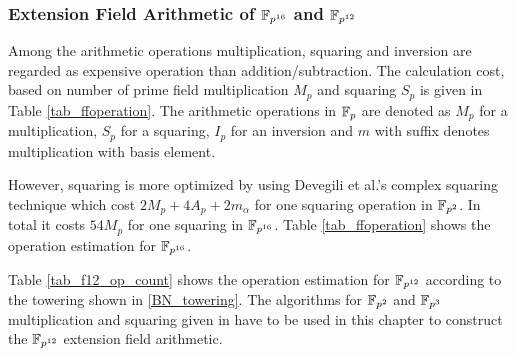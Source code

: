 \subsubsection{Extension Field Arithmetic  of \texorpdfstring{$\FPSN$}{} and \texorpdfstring{$\mathbb{F}_{p^{12}}$}{}}
Among the arithmetic operations multiplication, squaring and inversion are regarded as expensive operation than addition/subtraction. The calculation cost, based on number of prime field multiplication $M_p$ and squaring $S_p$ is given in Table \ref{tab_ffoperation}. The arithmetic operations in ${\mathbb{F}}_{p}$ are denoted as $M_p$ for a multiplication, $S_p$ for a squaring, $I_p$ for an inversion and $m$ with suffix denotes multiplication with basis element.
\begin{table*}[ht]
	\caption{Number of arithmetic operations in  $\FPSN$ based on \eqref{towering}.}
	\label{tab_ffoperation}
	\centering
\end{table*}
However, squaring is more optimized by using Devegili et al.'s \cite{EPRINT:DOSD06} complex squaring technique which cost $2M_p+4A_p+2m_\alpha$ for one squaring operation in $\mathbb{F}_{p^2}$. In total it costs $54M_p$ for one squaring in $\FPSN$. Table \ref{tab_ffoperation} shows the operation estimation for $\FPSN$.

Table \ref{tab_f12_op_count} shows the operation estimation for $\mathbb{F}_{p^{12}}$ according to the towering shown in \eqref{BN_towering}. The algorithms for $\mathbb{F}_{p^2}$ and $\mathbb{F}_{p^3}$ multiplication and squaring given in \cite{EPRINT:DEHR15} have to be used in this chapter to construct the $\mathbb{F}_{p^{12}}$ extension field arithmetic. 

